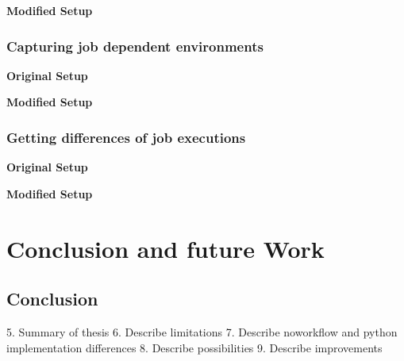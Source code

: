 \documentclass[draft,final]{vutinfth} %
\begin{document}
\textbf{Modified Setup}



\subsection{Capturing job dependent environments}\label{Evaluation:Use Case2}

\textbf{Original Setup}

\textbf{Modified Setup}

\subsection{Getting differences of job executions}\label{Evaluation:Use Case3}

\textbf{Original Setup}

\textbf{Modified Setup}

\chapter{Conclusion and future Work}\label{Conclusion}

\section{Conclusion}

5.	Summary of thesis
6.	Describe limitations
7.	Describe noworkflow and python implementation differences 
8.	Describe possibilities
9.	Describe improvements
\end{document}
